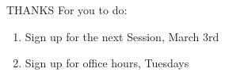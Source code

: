 \documentclass{beamer}
\begin{document}
\begin{frame}
    \Huge{THANKS} \newline
    \large{For you to do:}
    \begin{enumerate}
        \item Sign up for the next Session, March 3rd
        \item Sign up for office hours, Tuesdays
    \end{enumerate}
\end{frame}
\end{document}
